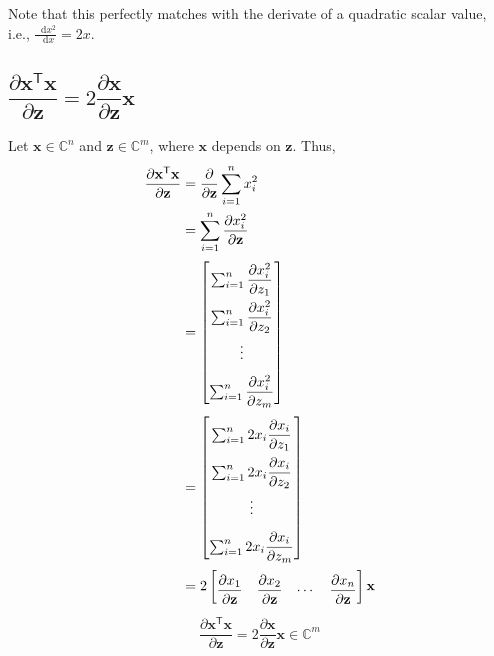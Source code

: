 \documentclass{article}
\newcommand{\trans}{\mathsf{T}}
\newcommand*\diff{\mathop{}\!\mathrm{d}}
\begin{document}
Note that this perfectly matches with the derivate of a quadratic scalar value, i.e., \(\frac{\diff x^2}{\diff x} = 2x\).

\subsection{\(\dfrac{\partial \mathbf{x}^\trans \mathbf{x}}{\partial \mathbf{z}} = 2\dfrac{\partial \mathbf{x}}{\partial \mathbf{z}}\mathbf{x}\)}
Let \(\mathbf{x} \in \mathbb{C}^{n}\) and \(\mathbf{z}\in \mathbb{C}^m\), where \(\mathbf{x}\) depends on \(\mathbf{z}\). Thus,
\begin{align}
    \dfrac{\partial \mathbf{x}^\trans \mathbf{x}}{\partial \mathbf{z}} & = \dfrac{\partial}{\partial \mathbf{z}}\sum_{i=1}^{n} x_i^2 \\
    & = \sum_{i=1}^{n} \dfrac{\partial x_i^2}{\partial \mathbf{z}} \\
    & = \renewcommand{\arraystretch}{2.2}\begin{bmatrix}
        \sum_{i=1}^{n} \dfrac{\partial x_i^2}{\partial z_1} \\
        \sum_{i=1}^{n} \dfrac{\partial x_i^2}{\partial z_2} \\
        \vdots \\
        \sum_{i=1}^{n} \dfrac{\partial x_i^2}{\partial z_m} \\
    \end{bmatrix} \\
    & = \renewcommand{\arraystretch}{2.2}\begin{bmatrix}
        \sum_{i=1}^{n} 2x_i\dfrac{\partial x_i}{\partial z_1} \\
        \sum_{i=1}^{n} 2x_i\dfrac{\partial x_i}{\partial z_2} \\
        \vdots \\
        \sum_{i=1}^{n} 2x_i\dfrac{\partial x_i}{\partial z_m} \\
    \end{bmatrix} \\
    & = 2 \renewcommand{\arraystretch}{2.2}\begin{bmatrix}
        \dfrac{\partial x_1}{\partial \mathbf{z}} & \dfrac{\partial x_2}{\partial \mathbf{z}} & \cdots & \dfrac{\partial x_n}{\partial \mathbf{z}}
    \end{bmatrix} \mathbf{x}
\end{align}
\begin{align}
    \boxed{\dfrac{\partial \mathbf{x}^\trans \mathbf{x}}{\partial \mathbf{z}} = 2\dfrac{\partial \mathbf{x}}{\partial \mathbf{z}}\mathbf{x} \in \mathbb{C}^m}
\end{align}
\end{document}
